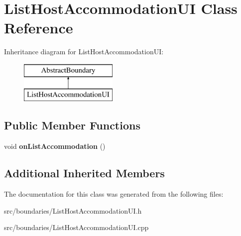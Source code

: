 \hypertarget{class_list_host_accommodation_u_i}{}\section{List\+Host\+Accommodation\+UI Class Reference}
\label{class_list_host_accommodation_u_i}
Inheritance diagram for List\+Host\+Accommodation\+UI\+:\begin{figure}[H]
\begin{center}
\leavevmode
\includegraphics[height=2.000000cm]{class_list_host_accommodation_u_i}
\end{center}
\end{figure}
\subsection*{Public Member Functions}
\begin{DoxyCompactItemize}
\item 
\mbox{\label{class_list_host_accommodation_u_i_a757ecf0a13adf19cdb60b581a59605bc}} 
void {\bfseries on\+List\+Accommodation} ()
\end{DoxyCompactItemize}
\subsection*{Additional Inherited Members}


The documentation for this class was generated from the following files\+:\begin{DoxyCompactItemize}
\item 
src/boundaries/List\+Host\+Accommodation\+U\+I.\+h\item 
src/boundaries/List\+Host\+Accommodation\+U\+I.\+cpp\end{DoxyCompactItemize}
